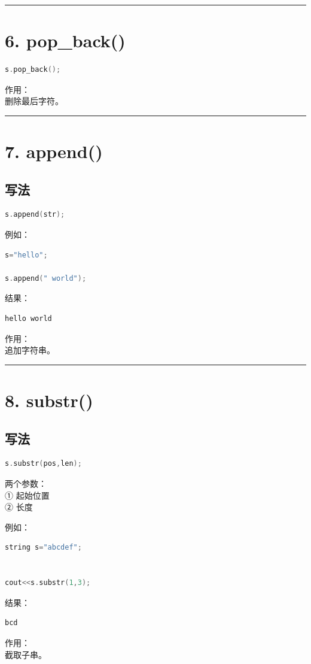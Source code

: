 \documentclass[9pt,twocolumn]{extarticle}
\begin{document}
\noindent\rule{\linewidth}{0.4pt}

\section{6. pop\_back()}
\begin{lstlisting}[language=C++]
s.pop_back();
\end{lstlisting}
作用：\\
删除最后字符。

\noindent\rule{\linewidth}{0.4pt}

\section{7. append()}

\subsection{写法}
\begin{lstlisting}[language=C++]
s.append(str);
\end{lstlisting}
例如：
\begin{lstlisting}[language=C++]
s="hello";

s.append(" world");
\end{lstlisting}
结果：
\begin{lstlisting}
hello world
\end{lstlisting}
作用：\\
追加字符串。

\noindent\rule{\linewidth}{0.4pt}

\section{8. substr()}

\subsection{写法}
\begin{lstlisting}[language=C++]
s.substr(pos,len);
\end{lstlisting}
两个参数：\\
① 起始位置\\
② 长度

例如：
\begin{lstlisting}[language=C++]
string s="abcdef";


cout<<s.substr(1,3);
\end{lstlisting}
结果：
\begin{lstlisting}
bcd
\end{lstlisting}
作用：\\
截取子串。
\end{document}
